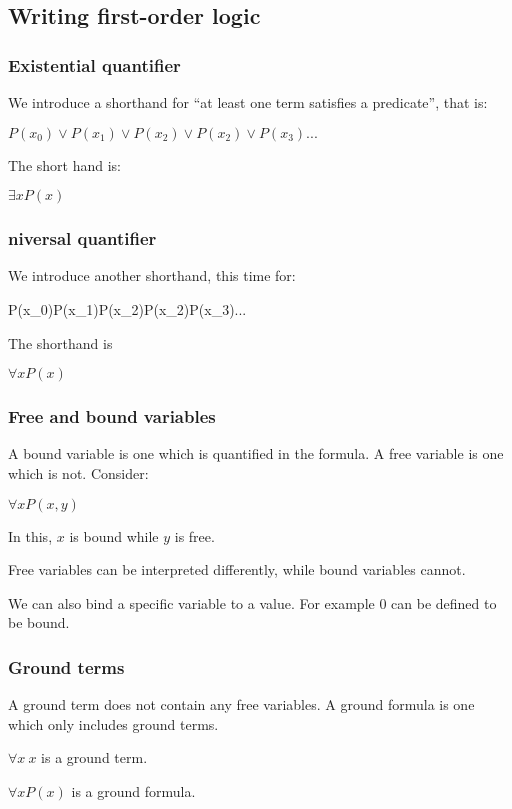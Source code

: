 
\subsection{Writing first-order logic}

\subsubsection{Existential quantifier}

We introduce a shorthand for “at least one term satisfies a predicate”, that is:

\(P(x_0)\lor P(x_1)\lor P(x_2)\lor P(x_2)\lor P(x_3)...\)

The short hand is:

\(\exists x P(x)\)

\subsubsection{niversal quantifier}

We introduce another shorthand, this time for:

\)P(x_0)\land P(x_1)\land P(x_2)\land P(x_2)\land P(x_3)...\)

The shorthand is

\(\forall x P(x)\)

\subsubsection{Free and bound variables}

A bound variable is one which is quantified in the formula. A free variable is one which is not. Consider:

\(\forall x P(x,y)\)

In this, \(x\) is bound while \(y\) is free.

Free variables can be interpreted differently, while bound variables cannot.

We can also bind a specific variable to a value. For example \(0\) can be defined to be bound.

\subsubsection{Ground terms}

A ground term does not contain any free variables. A ground formula is one which only includes ground terms.

\(\forall x\ x\) is a ground term.

\(\forall x P(x)\) is a ground formula.

